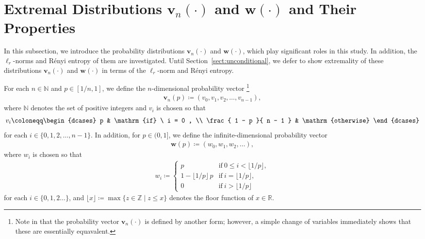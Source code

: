 \documentclass[conference, draftcls, onecolumn]{IEEEtran}
\theoremstyle{plain}
\newcommand{\bvec}[1]{\boldsymbol{#1}}
\newcommand{\sectref}[1]{Section~\ref{#1}}
\begin{document}
\section{Extremal Distributions $\bvec{v}_{n}( \cdot )$ and $\bvec{w}( \cdot )$ and Their Properties}
\label{sect:v_w}

In this subsection, we introduce the probability distributions $\bvec{v}_{n}( \cdot )$ and $\bvec{w}( \cdot )$, which play significant roles in this study.
In addition, the $\ell_{r}$-norms and R\'{e}nyi entropy of them are investigated.
Until \sectref{sect:unconditional}, we defer to show extremality of these distributions $\bvec{v}_{n}( \cdot )$ and $\bvec{w}( \cdot )$ in terms of the $\ell_{r}$-norm and R\'{e}nyi entropy.

For each $n \in \mathbb{N}$ and $p \in [1/n, 1]$, we define the $n$-dimensional probability vector%
\footnote{Note in \cite[Eq.~(3)]{part1} that the probability vector $\bvec{v}_{n}( \cdot )$ is defined by another form;
however, a simple change of variables immediately shows that these are essentially equavalent.}
\begin{align}
\bvec{v}_{n}( p )
\coloneqq
( v_{0}, v_{1}, v_{2}, \dots, v_{n-1} ) ,
\label{def:v}
\end{align}
where $\mathbb{N}$ denotes the set of positive integers and $v_{i}$ is chosen so that
\begin{align}
v_{i}
\coloneqq
\begin{dcases}
p
& \mathrm{if} \ i = 0 ,
\\
\frac{ 1 - p }{ n - 1 }
& \mathrm{otherwise}
\end{dcases}
\end{align}
for each $i \in \{ 0, 1, 2, \dots, n-1 \}$.
In addition, for $p \in (0, 1]$, we define the infinite-dimensional probability vector
\begin{align}
\bvec{w}( p )
\coloneqq
( w_{0}, w_{1}, w_{2}, \dots ) ,
\label{def:w}
\end{align}
where  $w_{i}$ is chosen so that
\begin{align}
w_{i}
\coloneqq
\begin{cases}
p
& \mathrm{if} \ 0 \le i < \lfloor 1/p \rfloor ,
\\
1 - \lfloor 1 / p \rfloor \, p
& \mathrm{if} \ i = \lfloor 1/p \rfloor ,
\\
0
& \mathrm{if} \ i > \lfloor 1/p \rfloor
\end{cases}
\end{align}
for each $i \in \{ 0, 1, 2 \dots \}$, and $\lfloor x \rfloor \coloneqq \max \{ z \in \mathbb{Z} \mid z \le x \}$ denotes the floor function of $x \in \mathbb{R}$.
\end{document}
